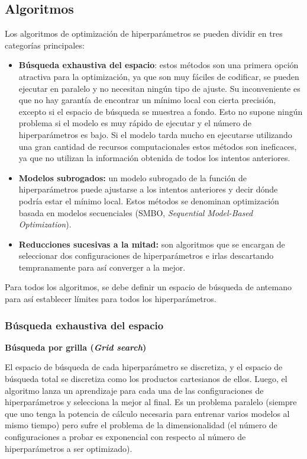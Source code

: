 \documentclass[a4paper,12pt]{article}
\begin{document}
\subsection{Algoritmos} \label{algo-hp}

Los algoritmos de optimización de hiperparámetros se pueden dividir en tres categorías principales:
\begin{itemize}[noitemsep, topsep=2pt]
	\item \textbf{Búsqueda exhaustiva del espacio}: estos métodos son una primera opción atractiva para la optimización, ya que son muy fáciles de codificar, se pueden ejecutar en paralelo y no necesitan ningún tipo de ajuste. Su inconveniente es que no hay garantía de encontrar un mínimo local con cierta precisión, excepto si el espacio de búsqueda se muestrea a fondo. Esto no supone ningún problema si el modelo es muy rápido de ejecutar y el número de hiperparámetros es bajo. Si el modelo tarda mucho en ejecutarse utilizando una gran cantidad de recursos computacionales estos métodos son ineficaces, ya que no utilizan la información obtenida de todos los intentos anteriores.
	\item \textbf{Modelos subrogados:} un modelo subrogado de la función de hiperparámetros puede ajustarse a los intentos anteriores y decir dónde podría estar el mínimo local. Estos métodos se denominan optimización basada en modelos secuenciales (SMBO, \textit{Sequential Model-Based Optimization}).
	\item \textbf{Reducciones sucesivas a la mitad:} son algoritmos que se encargan de seleccionar dos configuraciones de hiperparámetros e irlas descartando tempranamente para así converger a la mejor.
\end{itemize}

Para todos los algoritmos, se debe definir un espacio de búsqueda de antemano para así establecer límites para todos los hiperparámetros.

\subsubsection{Búsqueda exhaustiva del espacio}
\textbf{Búsqueda por grilla (\textit{Grid search})}

El espacio de búsqueda de cada hiperparámetro se discretiza, y el espacio de búsqueda total se discretiza como los productos cartesianos de ellos. Luego, el algoritmo lanza un aprendizaje para cada una de las configuraciones de hiperparámetros y selecciona la mejor al final. Es un problema paralelo (siempre que uno tenga la potencia de cálculo necesaria para entrenar varios modelos al mismo tiempo) pero sufre el problema de la dimensionalidad (el número de configuraciones a probar es exponencial con respecto al número de hiperparámetros a ser optimizado).
\end{document}
